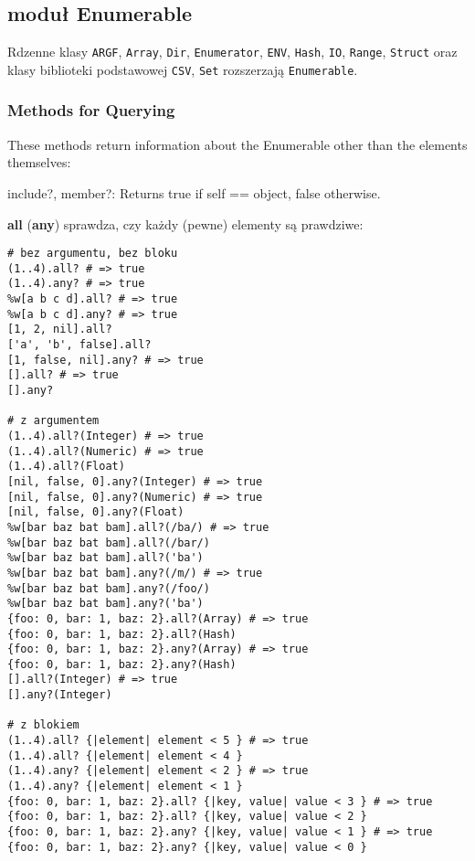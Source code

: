 \subsection{moduł Enumerable}
Rdzenne klasy \texttt{ARGF}, \texttt{Array}, \texttt{Dir}, \texttt{Enumerator}, \texttt{ENV}, \texttt{Hash}, \texttt{IO}, \texttt{Range}, \texttt{Struct} oraz klasy biblioteki podstawowej \texttt{CSV}, \texttt{Set} rozszerzają \texttt{Enumerable}.

\subsubsection{Methods for Querying}
These methods return information about the Enumerable other than the elements themselves:

include?, member?: Returns true if self == object, false otherwise.

\textbf{all} (\textbf{any}) sprawdza, czy każdy (pewne) elementy są prawdziwe:
\begin{verbatim}
# bez argumentu, bez bloku
(1..4).all? # => true
(1..4).any? # => true
%w[a b c d].all? # => true
%w[a b c d].any? # => true
[1, 2, nil].all?
['a', 'b', false].all?
[1, false, nil].any? # => true
[].all? # => true
[].any?

# z argumentem
(1..4).all?(Integer) # => true
(1..4).all?(Numeric) # => true
(1..4).all?(Float)
[nil, false, 0].any?(Integer) # => true
[nil, false, 0].any?(Numeric) # => true
[nil, false, 0].any?(Float)
%w[bar baz bat bam].all?(/ba/) # => true
%w[bar baz bat bam].all?(/bar/)
%w[bar baz bat bam].all?('ba')
%w[bar baz bat bam].any?(/m/) # => true
%w[bar baz bat bam].any?(/foo/)
%w[bar baz bat bam].any?('ba')
{foo: 0, bar: 1, baz: 2}.all?(Array) # => true
{foo: 0, bar: 1, baz: 2}.all?(Hash)
{foo: 0, bar: 1, baz: 2}.any?(Array) # => true
{foo: 0, bar: 1, baz: 2}.any?(Hash)
[].all?(Integer) # => true
[].any?(Integer)

# z blokiem
(1..4).all? {|element| element < 5 } # => true
(1..4).all? {|element| element < 4 }
(1..4).any? {|element| element < 2 } # => true
(1..4).any? {|element| element < 1 }
{foo: 0, bar: 1, baz: 2}.all? {|key, value| value < 3 } # => true
{foo: 0, bar: 1, baz: 2}.all? {|key, value| value < 2 }
{foo: 0, bar: 1, baz: 2}.any? {|key, value| value < 1 } # => true
{foo: 0, bar: 1, baz: 2}.any? {|key, value| value < 0 }
\end{verbatim}

